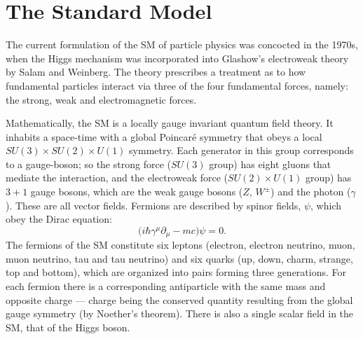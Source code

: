 \section{The Standard Model}
\label{sec:sm}
The current formulation of the SM of particle physics was concocted in the 1970s, when the Higgs
mechanism was incorporated into Glashow's electroweak theory by Salam and Weinberg.
The theory prescribes a treatment
as to how fundamental particles interact via three of the four
fundamental forces, namely: the strong, weak and electromagnetic forces.


Mathematically, the SM is a locally gauge invariant quantum field theory.
It inhabits a space-time with a global Poincar\'e symmetry that obeys a local
$SU(3)\times SU(2)\times U(1)$ symmetry.
Each generator in this group corresponds to a gauge-boson; so the strong force ($SU(3)$ group) has
eight gluons that mediate the interaction, and the electroweak force ($SU(2)\times U(1)$ group) has
$3+1$ gauge bosons, which are the weak gauge bosons ($Z$, $W^\pm$) and the photon ($\gamma$).
These are all vector fields.
Fermions are described by spinor fields, $\psi$, which obey the Dirac equation:
\begin{equation}
  \big(i\hbar\gamma^\mu\partial_\mu - mc\big)\psi = 0.
  \label{th:eq:dirac}
\end{equation}
The fermions of the SM constitute six leptons (electron, electron neutrino, muon, muon neutrino,
tau and tau neutrino) and six quarks (up, down, charm, strange, top and bottom), which are
organized into pairs forming three generations.
For each fermion there is a corresponding antiparticle with the same mass and opposite charge ---
charge being the conserved quantity resulting from the global gauge symmetry (by Noether's
theorem).
There is also a single scalar field in the SM, that of the Higgs boson.

